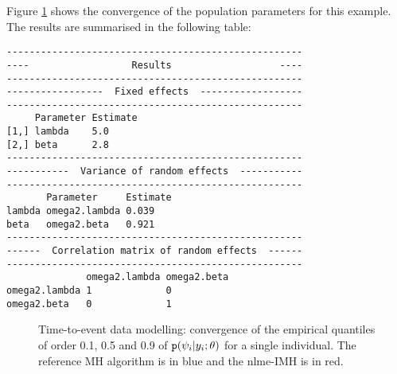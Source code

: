 Figure \ref{fig:popTTE} shows the convergence of the population parameters for this example. The results are summarised in the following table:

\begin{verbatim}
----------------------------------------------------
----                  Results                   ----
----------------------------------------------------
-----------------  Fixed effects  ------------------
----------------------------------------------------
     Parameter Estimate
[1,] lambda    5.0     
[2,] beta      2.8     
----------------------------------------------------
-----------  Variance of random effects  -----------
----------------------------------------------------
       Parameter     Estimate
lambda omega2.lambda 0.039   
beta   omega2.beta   0.921   
----------------------------------------------------
------  Correlation matrix of random effects  ------
----------------------------------------------------
              omega2.lambda omega2.beta
omega2.lambda 1             0          
omega2.beta   0             1 
\end{verbatim}


\begin{figure}[!h]
\begin{center}
\par \kern -1cm
\end{center}
\par \kern -0.5cm
\caption{Time-to-event data modelling: convergence of the empirical quantiles of order 0.1, 0.5 and 0.9 of $\texttt{p}(\psi_i | y_i ; \theta)$ for a single individual. The reference MH algorithm is in blue and the nlme-IMH is in red.} \label{fig:popTTE}
\end{figure}

